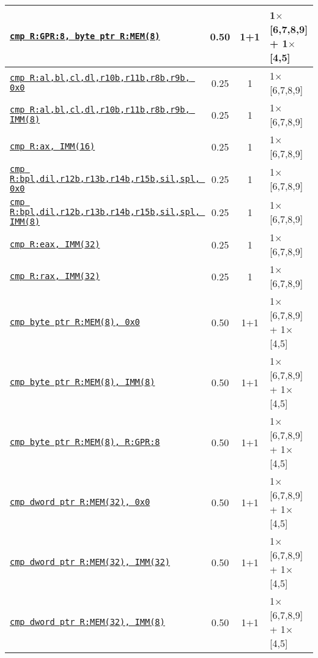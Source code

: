 \documentclass[a4paper,english,fontsize=9]{scrartcl}
\begin{document}
\begin{longtable}{p{}ccL{.25\textwidth}}
  \texttt{\href{https://felixcloutier.com/x86/CMP.html}{cmp R:GPR:8, byte ptr R:MEM(8)}} & 0.50 & 1+1 & 1\(\times\)[6,7,8,9] + 1\(\times\)[4,5] \\
  \midrule
  \texttt{\href{https://felixcloutier.com/x86/CMP.html}{cmp R:al,bl,cl,dl,r10b,r11b,r8b,r9b, 0x0}} & 0.25 & 1 & 1\(\times\)[6,7,8,9] \\
  \midrule
  \texttt{\href{https://felixcloutier.com/x86/CMP.html}{cmp R:al,bl,cl,dl,r10b,r11b,r8b,r9b, IMM(8)}} & 0.25 & 1 & 1\(\times\)[6,7,8,9] \\
  \midrule
  \texttt{\href{https://felixcloutier.com/x86/CMP.html}{cmp R:ax, IMM(16)}} & 0.25 & 1 & 1\(\times\)[6,7,8,9] \\
  \midrule
  \texttt{\href{https://felixcloutier.com/x86/CMP.html}{cmp R:bpl,dil,r12b,r13b,r14b,r15b,sil,spl, 0x0}} & 0.25 & 1 & 1\(\times\)[6,7,8,9] \\
  \midrule
  \texttt{\href{https://felixcloutier.com/x86/CMP.html}{cmp R:bpl,dil,r12b,r13b,r14b,r15b,sil,spl, IMM(8)}} & 0.25 & 1 & 1\(\times\)[6,7,8,9] \\
  \midrule
  \texttt{\href{https://felixcloutier.com/x86/CMP.html}{cmp R:eax, IMM(32)}} & 0.25 & 1 & 1\(\times\)[6,7,8,9] \\
  \midrule
  \texttt{\href{https://felixcloutier.com/x86/CMP.html}{cmp R:rax, IMM(32)}} & 0.25 & 1 & 1\(\times\)[6,7,8,9] \\
  \midrule
  \texttt{\href{https://felixcloutier.com/x86/CMP.html}{cmp byte ptr R:MEM(8), 0x0}} & 0.50 & 1+1 & 1\(\times\)[6,7,8,9] + 1\(\times\)[4,5] \\
  \midrule
  \texttt{\href{https://felixcloutier.com/x86/CMP.html}{cmp byte ptr R:MEM(8), IMM(8)}} & 0.50 & 1+1 & 1\(\times\)[6,7,8,9] + 1\(\times\)[4,5] \\
  \midrule
  \texttt{\href{https://felixcloutier.com/x86/CMP.html}{cmp byte ptr R:MEM(8), R:GPR:8}} & 0.50 & 1+1 & 1\(\times\)[6,7,8,9] + 1\(\times\)[4,5] \\
  \midrule
  \texttt{\href{https://felixcloutier.com/x86/CMP.html}{cmp dword ptr R:MEM(32), 0x0}} & 0.50 & 1+1 & 1\(\times\)[6,7,8,9] + 1\(\times\)[4,5] \\
  \midrule
  \texttt{\href{https://felixcloutier.com/x86/CMP.html}{cmp dword ptr R:MEM(32), IMM(32)}} & 0.50 & 1+1 & 1\(\times\)[6,7,8,9] + 1\(\times\)[4,5] \\
  \midrule
  \texttt{\href{https://felixcloutier.com/x86/CMP.html}{cmp dword ptr R:MEM(32), IMM(8)}} & 0.50 & 1+1 & 1\(\times\)[6,7,8,9] + 1\(\times\)[4,5] \\

\end{longtable}
\end{document}
